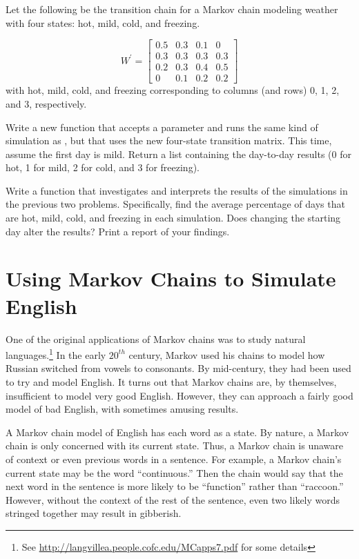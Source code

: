 \begin{problem} %
Let the following be the transition chain for a Markov chain modeling weather with four states: hot, mild, cold, and freezing.

\[ W^\prime = \left[\begin{array}{cccc}
0.5 & 0.3 & 0.1 & 0\\
0.3 & 0.3 & 0.3 & 0.3\\
0.2 & 0.3 & 0.4 & 0.5\\
  0 & 0.1 & 0.2 & 0.2\end{array} \right]\]
with hot, mild, cold, and freezing corresponding to columns (and rows) 0, 1, 2, and 3, respectively.

Write a new function that accepts a parameter  and runs the same kind of simulation as , but that uses the new four-state transition matrix.
This time, assume the first day is mild.
Return a list containing the day-to-day results (0 for hot, 1 for mild, 2 for cold, and 3 for freezing).
\label{problem:transition}
\end{problem}

\begin{problem} %
Write a function that investigates and interprets the results of the simulations in the previous two problems.
Specifically, find the average percentage of days that are hot, mild, cold, and freezing in each simulation.
Does changing the starting day alter the results?
Print a report of your findings.
\end{problem}

\section*{Using Markov Chains to Simulate English} %
One of the original applications of Markov chains was to study natural languages.\footnote{See \url{http://langvillea.people.cofc.edu/MCapps7.pdf} for some details}
In the early $20^{th}$ century, Markov used his chains to model how Russian switched from vowels to consonants.
By mid-century, they had been used to try and model English.
It turns out that Markov chains are, by themselves, insufficient to model very good English.
However, they can approach a fairly good model of bad English, with sometimes amusing results.

A Markov chain model of English has each word as a state.
By nature, a Markov chain is only concerned with its current state.
Thus, a Markov chain is unaware of context or even previous words in a sentence.
For example, a Markov chain's current state may be the word ``continuous.''
Then the chain would say that the next word in the sentence is more likely to be ``function'' rather than ``raccoon.''
However, without the context of the rest of the sentence, even two likely words stringed together may result in gibberish.

